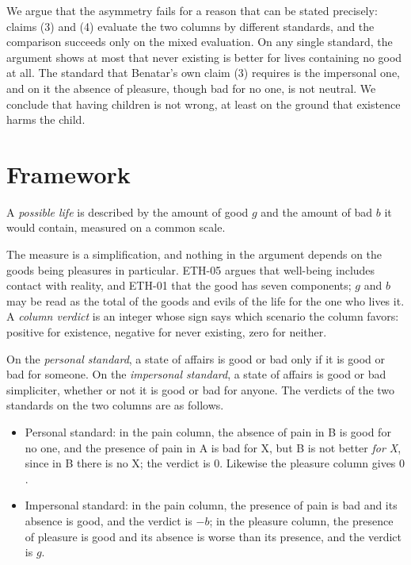 \documentclass{situationist-preprint}
\begin{document}
We argue that the asymmetry fails for a reason that can be stated precisely: claims (3) and (4) evaluate the two columns by different standards, and the comparison succeeds only on the mixed evaluation. On any single standard, the argument shows at most that never existing is better for lives containing no good at all. The standard that Benatar's own claim (3) requires is the impersonal one, and on it the absence of pleasure, though bad for no one, is not neutral. We conclude that having children is not wrong, at least on the ground that existence harms the child.

\section{Framework}

\begin{definition}[Lives]\label{d:life}
A \emph{possible life} is described by the amount of good $g$ and the amount of bad $b$ it would contain, measured on a common scale.
\end{definition}

The measure is a simplification, and nothing in the argument depends on the goods being pleasures in particular. ETH-05 argues that well-being includes contact with reality, and ETH-01 that the good has seven components; $g$ and $b$ may be read as the total of the goods and evils of the life for the one who lives it. A \emph{column verdict} is an integer whose sign says which scenario the column favors: positive for existence, negative for never existing, zero for neither.

\begin{definition}[Standards]\label{d:standards}
On the \emph{personal standard}, a state of affairs is good or bad only if it is good or bad for someone. On the \emph{impersonal standard}, a state of affairs is good or bad simpliciter, whether or not it is good or bad for anyone. The verdicts of the two standards on the two columns are as follows.
\begin{itemize}
\item Personal standard: in the pain column, the absence of pain in B is good for no one, and the presence of pain in A is bad for X, but B is not better \emph{for X}, since in B there is no X; the verdict is $0$. Likewise the pleasure column gives $0$.
\item Impersonal standard: in the pain column, the presence of pain is bad and its absence is good, and the verdict is $-b$; in the pleasure column, the presence of pleasure is good and its absence is worse than its presence, and the verdict is $g$.
\end{itemize}
\end{definition}
\end{document}
